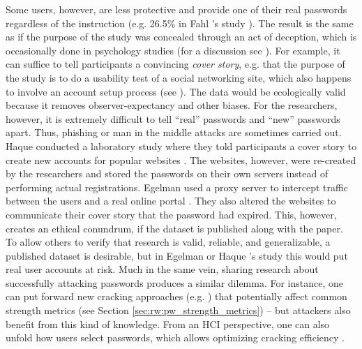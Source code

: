 Some users, however, are less protective and provide one of their real passwords regardless of the instruction (e.g. 26.5\% in Fahl \etal's study \cite{Fahl2013EcologicalValidityPasswordStudy}). The result is the same as if the purpose of the study was concealed through an act of deception, which is occasionally done in psychology studies (for a discussion see \cite{Tai2012Deception}). For example, it can suffice to tell participants a convincing \textit{cover story}, e.g. that the purpose of the study is to do a usability test of a social networking site, which also happens to involve an account setup process (see \cite{Furnell2017GuidanceCompliance}). The data would be ecologically valid because it removes observer-expectancy and other biases. For the researchers, however, it is extremely difficult to tell ``real'' passwords and ``new'' passwords apart. Thus, phishing or man in the middle attacks are sometimes carried out. Haque \etal conducted a laboratory study where they told participants a cover story to create new accounts for popular websites \cite{Haque2014Hierarchy}. The websites, however, were re-created by the researchers and stored the passwords on their own servers instead of performing actual registrations. Egelman \etal used a proxy server to intercept traffic between the users and a real online portal \cite{Egelman2013DoesMyPasswordGoUpToEleven}. They also altered the websites to communicate their cover story that the password had expired. This, however, creates an ethical conundrum, if the dataset is published along with the paper. To allow others to verify that research is valid, reliable, and generalizable, a published dataset is desirable, but in Egelman \etal or Haque \etal's study this would put real user accounts at risk.
Much in the same vein, sharing research about successfully attacking passwords produces a similar dilemma. For instance, one can put forward new cracking approaches (e.g. \cite{Marechal2008AdvancesPWCracking, Narayanan2005FastDictionaryAttacks, Schmidt2013Pitfalls, Weir2009PCFG}) that potentially affect common strength metrics (see Section \ref{sec:rw:pw_strength_metrics}) -- but attackers also benefit from this kind of knowledge. From an HCI perspective, one can also unfold how users select passwords, which allows optimizing cracking efficiency \cite{Weir2010MetricsPolicies, Wheeler2016zxcvbn}. 



